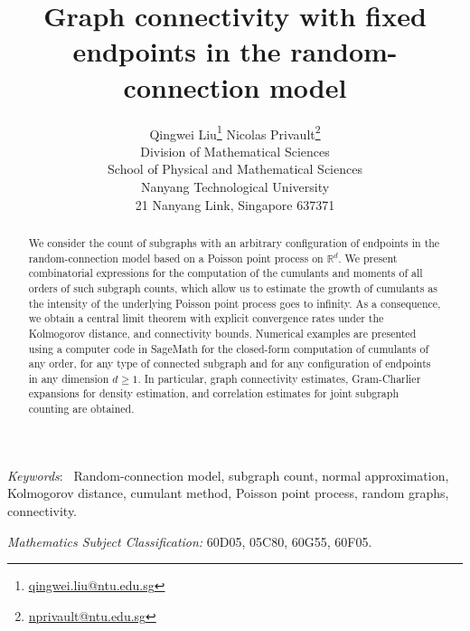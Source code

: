 \documentclass[12pt]{article}
\def\real{{\mathord{\mathbb R}}}
\numberwithin{equation}{section}
\begin{document}
\title{
\huge
 Graph connectivity with fixed endpoints in the random-connection model
} 

\author{
  Qingwei Liu\footnote{\href{mailto:qingwei.liu@ntu.edu.sg}{qingwei.liu@ntu.edu.sg}}
  \qquad
      Nicolas Privault\footnote{
\href{mailto:nprivault@ntu.edu.sg}{nprivault@ntu.edu.sg}
}
  \\
\small
Division of Mathematical Sciences
\\
\small
School of Physical and Mathematical Sciences
\\
\small
Nanyang Technological University
\\
\small
21 Nanyang Link, Singapore 637371
}

\maketitle

\vspace{-0.5cm}

\begin{abstract} 
We consider the count of subgraphs with an arbitrary configuration of endpoints in the random-connection model based on a Poisson point process on $\real^d$. We present combinatorial expressions for the computation of the cumulants and moments of all orders of such subgraph counts, which allow us to estimate the growth of cumulants as the intensity of the underlying Poisson point process goes to infinity. As a consequence, we obtain a central limit theorem with explicit convergence rates under the Kolmogorov distance, and connectivity bounds. Numerical examples are presented using a computer code in SageMath for the closed-form computation of cumulants of any order, for any type of connected subgraph and for any configuration of endpoints in any dimension $d\geq 1$. In particular, graph connectivity estimates, Gram-Charlier expansions for density estimation, and correlation estimates for joint subgraph counting are obtained. 
\end{abstract}
\noindent\emph{Keywords}:~
Random-connection model, 
subgraph count,
normal approximation,
Kolmogorov distance,
cumulant method,
Poisson point process,
random graphs,
connectivity.

\noindent 
{\em Mathematics Subject Classification:} 
60D05, %
05C80, %
60G55, %
60F05. %
 
\end{document}
